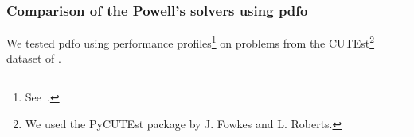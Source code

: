 \documentclass[usenames,dvipsnames,10pt]{beamer}
\begin{document}
\begin{frame}
    \frametitle{Comparison of the Powell's solvers using \gls{pdfo}}

    We tested \alert{\gls{pdfo}} using performance profiles\footnote{See~\textcite{Dolan_More_2002, More_Wild_2009}.} on problems from the CUTEst\footnote{We used the PyCUTEst package by J. Fowkes and L. Roberts.} dataset of \textcite{Gould_Orban_Toint_2015}.

    \begin{figure}
        \centering
    \end{figure}
\end{frame}
\end{document}

